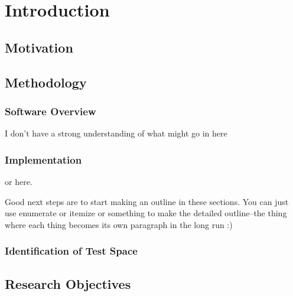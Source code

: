 \chapter{Introduction}

\section{Motivation}
\section{Methodology}
\subsection{Software Overview}
I don't have a strong understanding of what might go in here
\subsection{Implementation}
or here.

Good next steps are to start making an outline in these sections. 
You can just use enumerate or itemize or something to make the detailed outline--the thing where each thing becomes its own paragraph in the long run :) 
\subsection{Identification of Test Space}
\section{Research Objectives}


